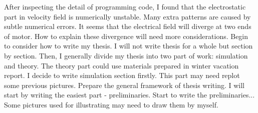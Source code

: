 \documentclass[fontsize=11pt, %
                             paper=a4, %
                             twoside, %
                             captions=tableheading,
                             index=totoc,
                             hyperref]{labbook}
\begin{document}
\begin{addmargin}[4cm]{0cm}
After inspecting the detail of programming code, I found that the electrostatic part in velocity field is numerically unstable. Many extra patterns are caused by subtle numerical errors. It seems that the electrical field will diverge at two ends of motor. How to explain these divergence will need more considerations.
Begin to consider how to write my thesis. I will not write thesis for a whole but section by section. Then, I generally divide my thesis into two part of work: simulation and theory. The theory part could use materials prepared in winter vacation report. I decide to write simulation section firstly. This part may need replot some previous pictures.
Prepare the general framework of thesis writing. I will start by writing the easiest part - preliminaries.
Start to write the preliminaries... Some pictures used for illustrating may need to draw them by myself.





\end{addmargin}
\end{document}
